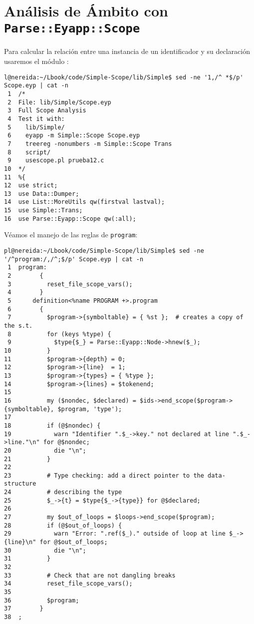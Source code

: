 \section{Análisis de Ámbito con {\tt Parse::Eyapp::Scope}}

Para calcular la relación entre una instancia de un identificador
y su declaración usaremos el módulo :
\begin{verbatim}
l@nereida:~/Lbook/code/Simple-Scope/lib/Simple$ sed -ne '1,/^ *$/p' Scope.eyp | cat -n
 1  /*
 2  File: lib/Simple/Scope.eyp
 3  Full Scope Analysis
 4  Test it with:
 5    lib/Simple/
 6    eyapp -m Simple::Scope Scope.eyp
 7    treereg -nonumbers -m Simple::Scope Trans
 8    script/
 9    usescope.pl prueba12.c
10  */
11  %{
12  use strict;
13  use Data::Dumper;
14  use List::MoreUtils qw(firstval lastval);
15  use Simple::Trans;
16  use Parse::Eyapp::Scope qw(:all);
\end{verbatim}

Véamos el 
manejo de las reglas de \verb|program|:

\begin{verbatim}
pl@nereida:~/Lbook/code/Simple-Scope/lib/Simple$ sed -ne '/^program:/,/^;$/p' Scope.eyp | cat -n
 1  program:
 2        {
 3          reset_file_scope_vars();
 4        }
 5      definition<%name PROGRAM +>.program
 6        {
 7          $program->{symboltable} = { %st };  # creates a copy of the s.t.
 8          for (keys %type) {
 9            $type{$_} = Parse::Eyapp::Node->hnew($_);
10          }
11          $program->{depth} = 0;
12          $program->{line}  = 1;
13          $program->{types} = { %type };
14          $program->{lines} = $tokenend;
15
16          my ($nondec, $declared) = $ids->end_scope($program->{symboltable}, $program, 'type');
17
18          if (@$nondec) {
19            warn "Identifier ".$_->key." not declared at line ".$_->line."\n" for @$nondec;
20            die "\n";
21          }
22
23          # Type checking: add a direct pointer to the data-structure
24          # describing the type
25          $_->{t} = $type{$_->{type}} for @$declared;
26
27          my $out_of_loops = $loops->end_scope($program);
28          if (@$out_of_loops) {
29            warn "Error: ".ref($_)." outside of loop at line $_->{line}\n" for @$out_of_loops;
30            die "\n";
31          }
32
33          # Check that are not dangling breaks
34          reset_file_scope_vars();
35
36          $program;
37        }
38  ;
\end{verbatim}

